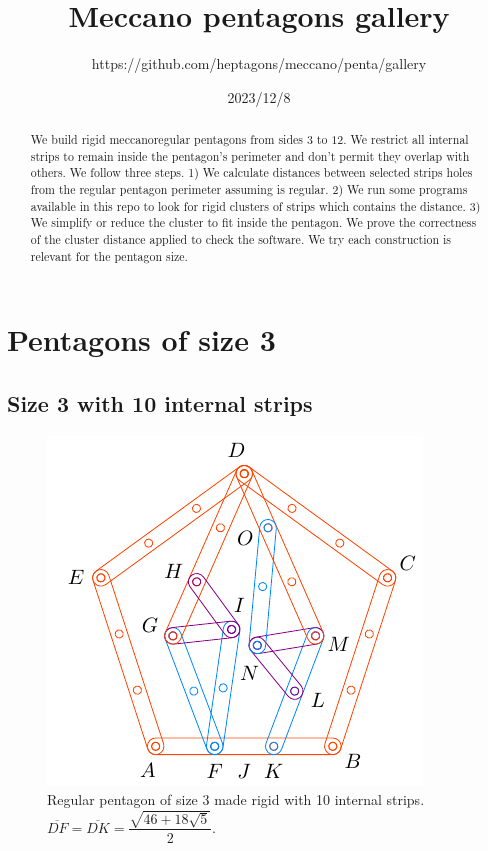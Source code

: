 \documentclass[11pt]{article}
\title{Meccano pentagons gallery}
\author{https://github.com/heptagons/meccano/penta/gallery}
\date{2023/12/8}
\begin{document}
\maketitle
\begin{abstract}
We build rigid meccano\meccanoref regular pentagons from sides $3$ to $12$. We restrict all internal strips to remain inside the pentagon's perimeter and don't permit they overlap with others. We follow three steps. 1) We calculate distances between selected strips holes from the regular pentagon perimeter assuming is regular. 2) We run some programs available in this repo to look for rigid clusters of strips which contains the distance. 3) We simplify or reduce the cluster to fit inside the pentagon. We prove the correctness of the cluster distance applied to check the software. We try each construction is relevant for the pentagon size.
\end{abstract}


\section{Pentagons of size 3}

\subsection{Size 3 with 10 internal strips}

\begin{figure}[H]
\centering
\includegraphics[scale=1.2]{3/penta3-10a}
\caption{Regular pentagon of size 3 made rigid with 10 internal strips. $\overline{DF} = \overline{DK} = \dfrac{\sqrt{46+18\sqrt5}}2$.}
\label{fig:penta3-10a}
\end{figure}
\end{document}
